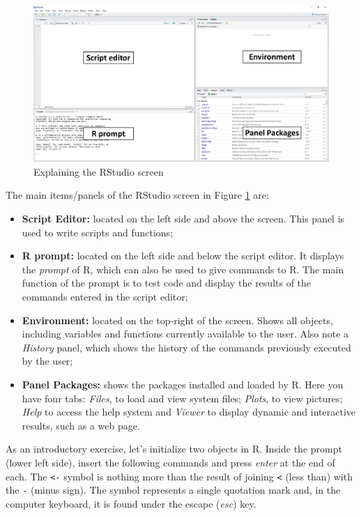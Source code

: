 \documentclass[11pt,]{book}
\begin{document}
\begin{figure}[!htbp]

{\centering \includegraphics[width=1\linewidth]{figs/RStudio2} 

}

\caption{Explaining the RStudio screen}\label{fig:RStudio2}
\end{figure}

The main items/panels of the RStudio screen in Figure \ref{fig:RStudio2}
are:

\begin{itemize}
\item
  \textbf{Script Editor:} located on the left side and above the screen.
  This panel is used to write scripts and functions;
\item
  \textbf{R prompt:} located on the left side and below the script
  editor. It displays the \emph{prompt} of R, which can also be used to
  give commands to R. The main function of the prompt is to test code
  and display the results of the commands entered in the script editor;
\item
  \textbf{Environment:} located on the top-right of the screen. Shows
  all objects, including variables and functions currently available to
  the user. Also note a \emph{History} panel, which shows the history of
  the commands previously executed by the user; 
\item
  \textbf{Panel Packages:} shows the packages installed and loaded by R.
  Here you have four tabs: \emph{Files}, to load and view system files;
  \emph{Plots}, to view pictures; \emph{Help} to access the help system
  and \emph{Viewer} to display dynamic and interactive results, such as
  a web page. 
\end{itemize}

As an introductory exercise, let's initialize two objects in R. Inside
the prompt (lower left side), insert the following commands and press
\emph{enter} at the end of each. The \texttt{\textless{}-} symbol is
nothing more than the result of joining \texttt{\textless{}} (less than)
with the \texttt{-} (minus sign). The \texttt{\textquotesingle{}} symbol
represents a single quotation mark and, in the computer keyboard, it is
found under the escape (\emph{esc}) key.
\end{document}

